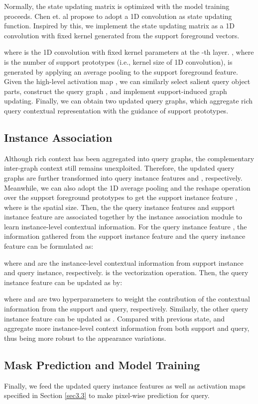 \documentclass{bmvc2k}
\begin{document}
Normally, the state updating matrix  is optimized with the model training proceeds. Chen et. al \cite{chen2019graph} propose to adopt a 1D convolution as state updating function. Inspired by this, we implement the state updating matrix as a 1D convolution with fixed kernel generated from the support foreground vectors.


where  is the 1D convolution with fixed kernel parameters  at the -th layer. , where  is the number of support prototypes (i.e., kernel size of 1D convolution), is generated by applying an average pooling to the support foreground feature.
Given the high-level activation map , we can similarly select salient query object parts, construct the query graph , and implement support-induced graph updating. Finally, we can obtain two updated query graphs, which aggregate rich query contextual representation with the guidance of support prototypes.

\subsection{Instance Association}
\label{IAM}
Although rich context has been aggregated into query graphs, the complementary inter-graph context still remains unexploited. Therefore, the updated query graphs are further transformed into query instance features  and , respectively. Meanwhile, we can also adopt the 1D average pooling and the reshape operation over the support foreground prototypes  to get the support instance feature , where  is the spatial size. Then, the the query instance features and support instance feature are associated together by the instance association module to learn instance-level contextual information.
For the query instance feature , the information gathered from the support instance feature  and the query instance feature  can be formulated as:

where  and  are the instance-level contextual information from support instance and query instance, respectively.  is the vectorization operation. Then, the query instance feature can be updated as  by:

where  and  are two hyperparameters to weight the contribution of the contextual information from the support and query, respectively. Similarly, the other query instance feature  can be updated as . Compared with previous state,  and  aggregate more instance-level context information from both support and query, thus being more robust to the appearance variations.
\subsection{ Mask Prediction and Model Training}
Finally, we feed the updated query instance features as well as activation maps specified in Section \ref{sec3.3} to make pixel-wise prediction for query.
\end{document}
